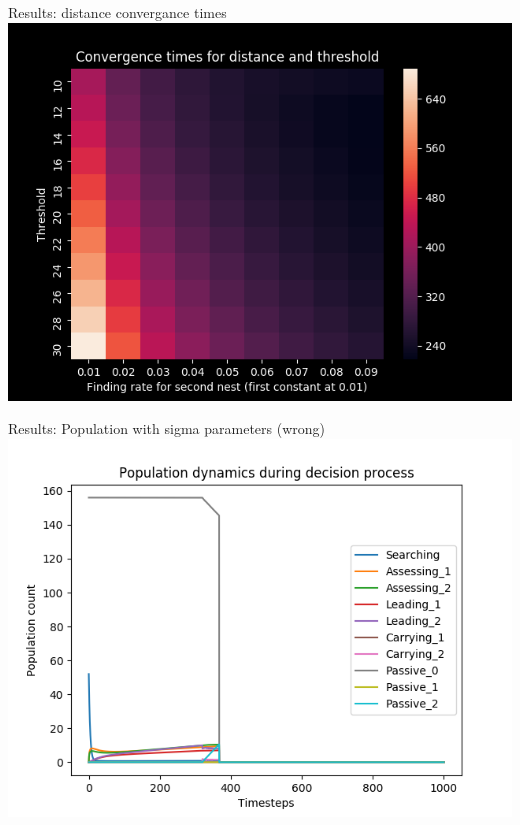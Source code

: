 \documentclass{beamer}
\begin{document}
\begin{frame}{Results: distance convergance times}
    \includegraphics[scale=0.7]{distance_convergance_times_t_over_10}
\end{frame}

\begin{frame}{Results: Population with sigma parameters (wrong)}
    \includegraphics[scale=0.7]{populations_saldyt_2018}
\end{frame}
\end{document}
